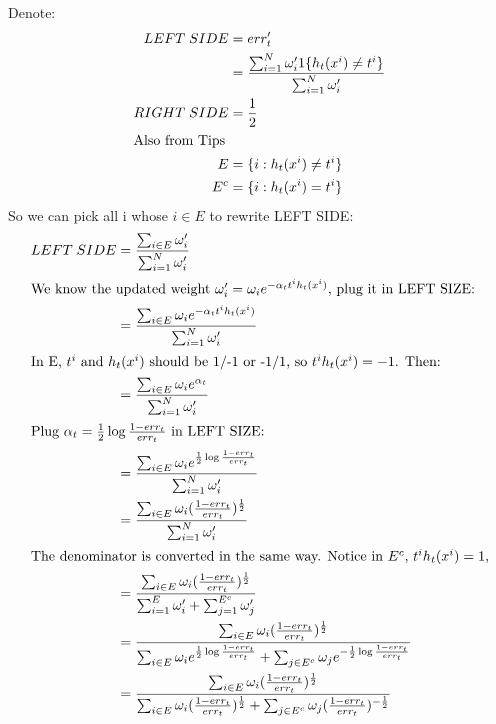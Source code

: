\documentclass{article}
\begin{document}
\section{}
Denote:
\begin{align*}
    LEFT\; SIDE &= err^\prime_t\\
                &= \frac{\sum_{i = 1}^{N}\omega ^\prime_i 1\{h_t(x^i)\neq t^i\}}{\sum_{i = 1}^{N}\omega ^\prime_i}\\
    RIGHT\; SIDE &= \frac{1}{2}\\
\intertext{Also from Tips}
    E &= \{i: h_t(x^i)\neq t^i\}\\
    E^c &= \{i: h_t(x^i) = t^i\}
\end{align*}
So we can pick all i whose $i\in E$ to rewrite LEFT SIDE:
\begin{align*}
    LEFT\; SIDE &= \frac{\sum_{i\in E}^{}\omega ^\prime_i}{\sum_{i = 1}^{N}\omega ^\prime_i}\\
\intertext{We know the updated weight $\omega ^\prime_i = \omega _ie^{-\alpha _t t^ih_t(x^i)}$, plug it in LEFT SIZE:}
    &= \frac{\sum_{i\in E}^{}\omega _ie^{-\alpha _t t^ih_t(x^i)}}{\sum_{i = 1}^{N}\omega ^\prime_i}\\
\intertext{In E, $t^i$ and $h_t(x^i)$ should be 1/-1 or -1/1, so $t^ih_t(x^i)=-1$. Then:}
    &= \frac{\sum_{i\in E}^{}\omega _ie^{\alpha _t}}{\sum_{i = 1}^{N}\omega ^\prime_i}\\
\intertext{Plug $\alpha _t = \frac{1}{2}\log \frac{1-err_t}{err_t}$ in LEFT SIZE:}
    &= \frac{\sum_{i\in E}^{}\omega _ie^{\frac{1}{2}\log \frac{1-err_t}{err_t}}}{\sum_{i = 1}^{N}\omega ^\prime_i}\\
    &= \frac{\sum_{i\in E}^{}\omega _i(\frac{1-err_t}{err_t})^{\frac{1}{2}}}{\sum_{i = 1}^{N}\omega ^\prime_i}\\
\intertext{The denominator is converted in the same way. Notice in $E^c$, $t^ih_t(x^i)=1$,}
    &= \frac{\sum_{i\in E}^{}\omega _i(\frac{1-err_t}{err_t})^{\frac{1}{2}}}{\sum_{i = 1}^{E}\omega ^\prime_i + \sum_{j = 1}^{E^c}\omega ^\prime_j}\\
    &= \frac{\sum_{i\in E}^{}\omega _i(\frac{1-err_t}{err_t})^{\frac{1}{2}}}{\sum_{i\in E}^{}\omega _ie^{\frac{1}{2}\log \frac{1-err_t}{err_t}} + \sum_{j\in E^c}^{}\omega _je^{-\frac{1}{2}\log \frac{1-err_t}{err_t}}}\\
    &= \frac{\sum_{i\in E}^{}\omega _i(\frac{1-err_t}{err_t})^{\frac{1}{2}}}{\sum_{i\in E}^{}\omega _i(\frac{1-err_t}{err_t})^{\frac{1}{2}} + \sum_{j\in E^c}^{}\omega _j(\frac{1-err_t}{err_t})^{-\frac{1}{2}}}\\

\end{align*}
\end{document}
